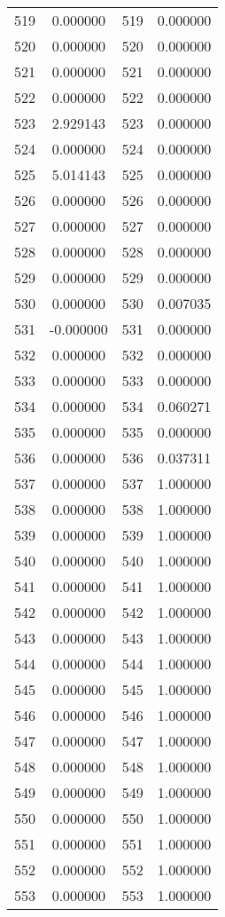 \documentclass[12pt]{article}
\begin{document}
\begin{longtable}{@{}cccc@{}}
519 & 0.000000 & 519 & 0.000000 \\
520 & 0.000000 & 520 & 0.000000 \\
521 & 0.000000 & 521 & 0.000000 \\
522 & 0.000000 & 522 & 0.000000 \\
523 & 2.929143 & 523 & 0.000000 \\
524 & 0.000000 & 524 & 0.000000 \\
525 & 5.014143 & 525 & 0.000000 \\
526 & 0.000000 & 526 & 0.000000 \\
527 & 0.000000 & 527 & 0.000000 \\
528 & 0.000000 & 528 & 0.000000 \\
529 & 0.000000 & 529 & 0.000000 \\
530 & 0.000000 & 530 & 0.007035 \\
531 & -0.000000 & 531 & 0.000000 \\
532 & 0.000000 & 532 & 0.000000 \\
533 & 0.000000 & 533 & 0.000000 \\
534 & 0.000000 & 534 & 0.060271 \\
535 & 0.000000 & 535 & 0.000000 \\
536 & 0.000000 & 536 & 0.037311 \\
537 & 0.000000 & 537 & 1.000000 \\
538 & 0.000000 & 538 & 1.000000 \\
539 & 0.000000 & 539 & 1.000000 \\
540 & 0.000000 & 540 & 1.000000 \\
541 & 0.000000 & 541 & 1.000000 \\
542 & 0.000000 & 542 & 1.000000 \\
543 & 0.000000 & 543 & 1.000000 \\
544 & 0.000000 & 544 & 1.000000 \\
545 & 0.000000 & 545 & 1.000000 \\
546 & 0.000000 & 546 & 1.000000 \\
547 & 0.000000 & 547 & 1.000000 \\
548 & 0.000000 & 548 & 1.000000 \\
549 & 0.000000 & 549 & 1.000000 \\
550 & 0.000000 & 550 & 1.000000 \\
551 & 0.000000 & 551 & 1.000000 \\
552 & 0.000000 & 552 & 1.000000 \\
553 & 0.000000 & 553 & 1.000000 \\

\end{longtable}
\end{document}
